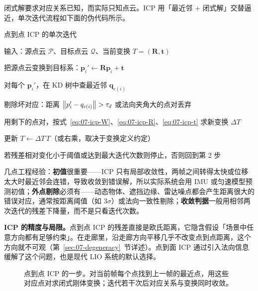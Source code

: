 闭式解要求对应关系已知，而实际只知点云。ICP 用「最近邻 + 闭式解」交替逼近，单次迭代流程如下面的伪代码所示。

\begin{pseudo}{点到点 ICP 的单次迭代}
  \item 输入：源点云 $\mathcal{P}$、目标点云 $\mathcal{Q}$、当前变换 $T=(\bm{R},\bm{t})$
  \item 把源点云变换到目标系：$\bm{p}_i'\leftarrow\bm{R}\bm{p}_i+\bm{t}$
  \item 对每个 $\bm{p}_i'$，在 KD 树中查最近邻 $\bm{q}_{c(i)}$
  \item 剔除坏对应：距离 $\left\lVert p_i'-q_{c(i)} \right\rVert>\tau_d$ 或法向夹角大的点对丢弃
  \item 用剩下的点对，按式~\eqref{eq:07-icp-W}、\eqref{eq:07-icp-R}、\eqref{eq:07-icp-t} 求新变换 $\Delta T$
  \item 更新 $T\leftarrow\Delta T\,T$（或右乘，取决于变换定义约定）
  \item 若残差相对变化小于阈值或达到最大迭代次数则停止，否则回到第 2 步
\end{pseudo}

几点工程经验：\textbf{初值}很重要——ICP 只有局部收敛性，两帧之间转得太快或位移太大时最近邻会连错，导致收敛到错误解，所以实际系统会用 IMU 或匀速模型预测初值；\textbf{外点剔除}必须有——动态物体、遮挡边缘、雷达噪点都会产生距离很大的错误对应，通常按距离阈值（如 $3\sigma$）或法向一致性剔除；\textbf{收敛判据}一般用相邻两次迭代的残差下降量，而不是只看迭代次数。

\textbf{ICP 的精度与局限。}点到点 ICP 的残差直接是欧氏距离，它隐含假设「场景中任意方向都有足够约束」。在走廊里，沿走廊方向平移几乎不改变点到点距离，这个方向就不可观（第~\ref{sec:07-degeneracy}~节详述）。点到面 ICP 通过引入法向信息缓解了这个问题，也是现代 LIO 系统的默认选择。

\begin{figure}[htbp]
  \centering
  \caption{点到点 ICP 的一步。对当前帧每个点找到上一帧的最近点，用这些对应点对求闭式刚体变换；迭代若干次后对应关系与变换同时收敛。}
  \label{fig:07-icp}
\end{figure}

